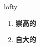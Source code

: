 
\begin{frame}
{\huge lofty}
\begin{center}
\begin{enumerate}\Large
  \item \textbf{崇高的}
  \item \textbf{自大的}
\end{enumerate}
\end{center}
\end{frame}
